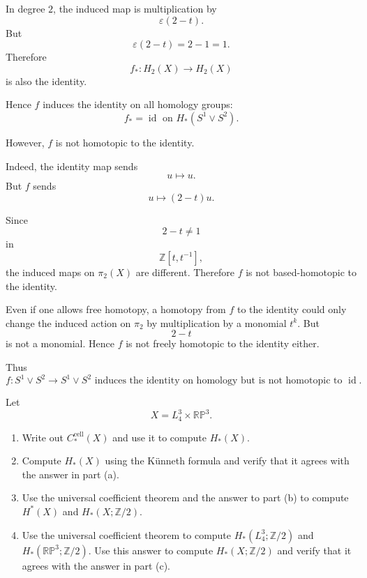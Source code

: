 \begin{solution}
In degree \(2\), the induced map is multiplication by
\[
\varepsilon(2-t).
\]
But
\[
\varepsilon(2-t)=2-1=1.
\]
Therefore
\[
f_*:H_2(X)\to H_2(X)
\]
is also the identity.

Hence \(f\) induces the identity on all homology groups:
\[
\boxed{
	f_*=\operatorname{id}
	\text{ on }H_*(S^1\vee S^2).
}
\]

However, \(f\) is not homotopic to the identity.

Indeed, the identity map sends
\[
u\mapsto u.
\]
But \(f\) sends
\[
u\mapsto (2-t)u.
\]

Since
\[
2-t\neq 1
\]
in
\[
\mathbb Z[t,t^{-1}],
\]
the induced maps on \(\pi_2(X)\) are different. Therefore \(f\) is not based-homotopic to the identity.

Even if one allows free homotopy, a homotopy from \(f\) to the identity could only change the induced action on \(\pi_2\) by multiplication by a monomial \(t^k\). But
\[
2-t
\]
is not a monomial. Hence \(f\) is not freely homotopic to the identity either.

Thus
\[
\boxed{
	f:S^1\vee S^2\to S^1\vee S^2
	\text{ induces the identity on homology but is not homotopic to }
	\operatorname{id}.
}
\]
\end{solution}

\begin{problem}
Let
\[
X=L_4^3\times \mathbb{RP}^3.
\]
\begin{enumerate}
	\item[(a)] Write out \(C_*^{\mathrm{cell}}(X)\) and use it to compute \(H_*(X)\).
	\item[(b)] Compute \(H_*(X)\) using the Künneth formula and verify that it agrees with the answer in part (a).
	\item[(c)] Use the universal coefficient theorem and the answer to part (b) to compute \(H^*(X)\) and \(H_*(X;\mathbb Z/2)\).
	\item[(d)] Use the universal coefficient theorem to compute \(H_*(L_4^3;\mathbb Z/2)\) and \(H_*(\mathbb{RP}^3;\mathbb Z/2)\). Use this answer to compute \(H_*(X;\mathbb Z/2)\) and verify that it agrees with the answer in part (c).
\end{enumerate}
\end{problem}

